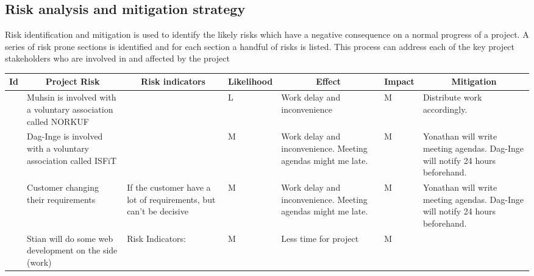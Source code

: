 \begin{landscape}

\subsection{Risk analysis and mitigation strategy}
Risk identification and mitigation is used to identify the likely risks which have a negative consequence on a normal progress of a project. A series of risk prone sections is identified and for each section a handful of risks is listed.  This process can address each of the key project stakeholders who are involved in and affected by the project	
\centering
\begin{longtable}{| p{0.4cm} | p{4cm} | p{4cm} | p{2cm} | p{4cm} | p{1cm} | p{4cm} |}
	\hline
		\multicolumn{1}{|c|}{ Id}   &
        \multicolumn{1}{c|}{ Project Risk}  &
		\multicolumn{1}{c|}{ Risk indicators}  &
		\multicolumn{1}{c|}{ Likelihood} &
		\multicolumn{1}{c|}{ Effect} &
		\multicolumn{1}{c|}{ Impact} &
		\multicolumn{1}{c|}{ Mitigation} \\
		\hline \hline
	\endhead

	\newcounter{riskId}

	\stepcounter{riskId}
	\centering
		\arabic{riskId} &
        Muhsin is involved with a voluntary association called NORKUF &
		&
		\centering L &
		Work delay and inconvenience &
		\centering M &
		Distribute work accordingly. \\
	\hline

	\stepcounter{riskId}
	\centering
		\arabic{riskId} &
        Dag-Inge is involved with a voluntary association called ISFiT &
		& \centering M &
		Work delay and inconvenience. Meeting agendas might me late. &
		\centering  M &
		Yonathan will write meeting agendas. Dag-Inge will notify 24 hours beforehand. \\
	\hline

	\stepcounter{riskId}
	\centering
		\arabic{riskId} &
        Customer changing their requirements &
		If the customer have a lot of requirements, but can’t be decisive &
		\centering M &
		Work delay and inconvenience. Meeting agendas might me late. &
		\centering  M &
		Yonathan will write meeting agendas. Dag-Inge will notify 24 hours beforehand. \\
	\hline

	\stepcounter{riskId}
	\centering
		\arabic{riskId} &
        Stian will do some web development on the side (work) &
		Risk Indicators: &
		\centering M &
		Less time for project &
		\centering M & \\
	\hline


\end{longtable}
\end{landscape}
